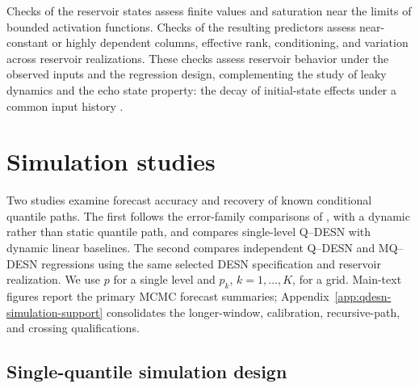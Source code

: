 Checks of the reservoir states assess finite values and saturation near the
limits of bounded activation functions. Checks of the resulting
predictors assess near-constant or highly dependent columns, effective rank,
conditioning, and variation across reservoir realizations. These checks
assess reservoir behavior under the observed inputs and the regression design, complementing the
study of leaky dynamics and the echo state property: the decay of initial-state
effects under a common input history
\citep{qdesn-JaegerLukoseviciusPopoviciSiewert2007LeakyESN,qdesn-YildizJaegerKiebel2012ESP}.



\section{Simulation studies}
\label{qdesn2026:sec:simulation}

\noindent
Two studies examine forecast accuracy and recovery of known conditional
quantile paths. The first follows the error-family comparisons of
\citet{exd-yan2025family}, with a dynamic rather than static quantile path, and
compares single-level Q--DESN with dynamic linear baselines. The second
compares independent Q--DESN and MQ--DESN regressions using the same selected
DESN specification and reservoir realization. We use \(p\) for a single level and \(p_k\), \(k=1,\ldots,K\),
for a grid. Main-text figures report the primary MCMC forecast summaries;
Appendix~\ref{app:qdesn-simulation-support} consolidates the longer-window,
calibration, recursive-path, and crossing qualifications.

\subsection{Single-quantile simulation design}

